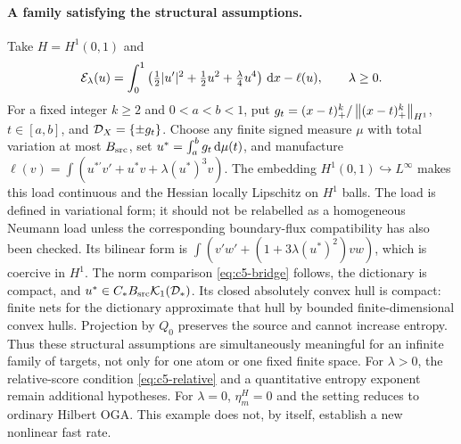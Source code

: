 \documentclass[11pt]{article}
\theoremstyle{remark}
\begin{document}
\paragraph{A family satisfying the structural assumptions.}
Take $H=H^1(0,1)$ and
\[
 \mathcal E_\lambda(u)=\int_0^1
 \left(\tfrac12|u'|^2+\tfrac12u^2+\tfrac\lambda4u^4\right)\,\mathrm d x-\ell(u),
 \qquad\lambda\geq0 .
\]
For a fixed integer $k\geq2$ and $0<a<b<1$, put
$g_t=(x-t)_+^k/\left\lVert(x-t)_+^k\right\rVert_{H^1}$, $t\in[a,b]$,
and $\mathcal D_X=\{\pm g_t\}$.
Choose any finite signed measure $\mu$ with total variation at most
$B_{\rm src}$, set $u^*=\int_a^b g_t\,\mathrm d\mu(t)$, and manufacture
$\ell(v)=\int(u^{*\prime}v'+u^*v+\lambda(u^*)^3v)$.
The embedding $H^1(0,1)\hookrightarrow L^\infty$ makes this load
continuous and the Hessian locally Lipschitz on $H^1$ balls.  The load is
defined in variational form; it should not be relabelled as a homogeneous
Neumann load unless the corresponding boundary-flux compatibility has also
been checked.
Its bilinear form is
$\int(v'w'+(1+3\lambda(u^*)^2)vw)$, which is coercive in $H^1$.
The norm comparison \eqref{eq:c5-bridge} follows, the dictionary is compact,
and $u^*\in C_*B_{\rm src}\mathcal K_1(\mathcal D_*)$.
Its closed absolutely convex hull is compact: finite nets for the
dictionary approximate that hull by bounded finite-dimensional convex hulls.
Projection by $Q_0$ preserves the source and cannot increase entropy.
Thus these structural assumptions are simultaneously meaningful for an
infinite family of targets, not only for one atom or one fixed finite space.
For $\lambda>0$, the relative-score condition
\eqref{eq:c5-relative} and a quantitative entropy exponent remain additional
hypotheses. For $\lambda=0$, $\eta_m^H=0$ and the setting reduces to
ordinary Hilbert OGA. This example does not, by itself, establish a new
nonlinear fast rate.
\end{document}
